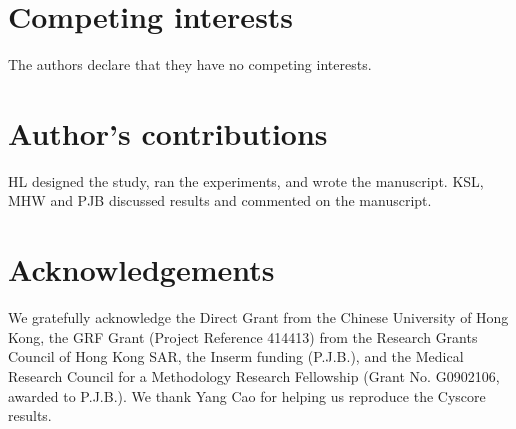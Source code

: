 \documentclass[twocolumn]{bmcart}
\begin{document}
\begin{backmatter}

\section*{Competing interests}
The authors declare that they have no competing interests.

\section*{Author's contributions}
HL designed the study, ran the experiments, and wrote the manuscript. KSL, MHW and PJB discussed results and commented on the manuscript.

\section*{Acknowledgements}
We gratefully acknowledge the Direct Grant from the Chinese University of Hong Kong, the GRF Grant (Project Reference 414413) from the Research Grants Council of Hong Kong SAR, the Inserm funding (P.J.B.), and the Medical Research Council for a Methodology Research Fellowship (Grant No. G0902106, awarded to P.J.B.). We thank Yang Cao for helping us reproduce the Cyscore results.





\end{backmatter}
\end{document}
